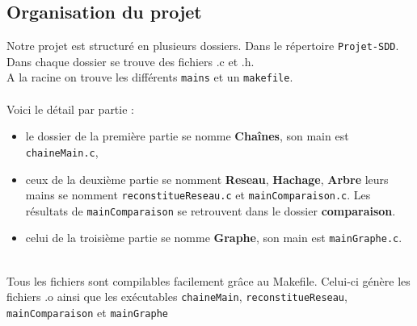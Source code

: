\documentclass[12pt]{extarticle}
\begin{document}
\subsection*{Organisation du projet}
Notre projet est structuré en plusieurs dossiers. Dans le répertoire \texttt{Projet-SDD}. Dans chaque dossier se trouve des fichiers .c et .h. \\
A la racine on trouve les différents \texttt{mains} et un \texttt{makefile}. \\ \\
Voici le détail par partie :
\begin{itemize}[label=-]
    \item le dossier de la première partie se nomme \textbf{Chaînes}, son main est \texttt{chaineMain.c},
    \item ceux de la deuxième partie se nomment \textbf{Reseau}, \textbf{Hachage}, \textbf{Arbre} leurs mains se nomment \texttt{reconstitueReseau.c} et \texttt{mainComparaison.c}. Les résultats de \texttt{mainComparaison} se retrouvent dans le dossier \textbf{comparaison}.
    \item celui de la troisième partie se nomme \textbf{Graphe}, son main est \texttt{mainGraphe.c}.
\end{itemize}
\\
Tous les fichiers sont compilables facilement grâce au Makefile. Celui-ci génère les fichiers .o ainsi que les exécutables \texttt{chaineMain}, \texttt{reconstitueReseau}, \texttt{mainComparaison} et \texttt{mainGraphe} 

\\ 
\newpage
\end{document}
